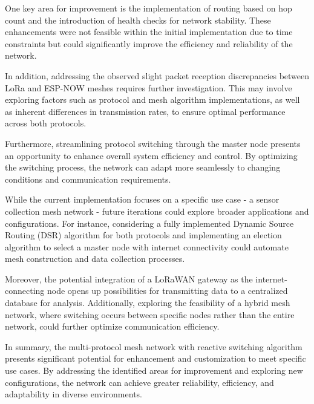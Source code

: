 One key area for improvement is the implementation of routing based on hop count and the introduction of health checks for network stability. These enhancements were not feasible within the initial implementation due to time constraints but could significantly improve the efficiency and reliability of the network.

In addition, addressing the observed slight packet reception discrepancies between LoRa and ESP-NOW meshes requires further investigation. This may involve exploring factors such as protocol and mesh algorithm implementations, as well as inherent differences in transmission rates, to ensure optimal performance across both protocols.

Furthermore, streamlining protocol switching through the master node presents an opportunity to enhance overall system efficiency and control. By optimizing the switching process, the network can adapt more seamlessly to changing conditions and communication requirements.

While the current implementation focuses on a specific use case - a sensor collection mesh network - future iterations could explore broader applications and configurations. For instance, considering a fully implemented Dynamic Source Routing (DSR) algorithm for both protocols and implementing an election algorithm to select a master node with internet connectivity could automate mesh construction and data collection processes.

Moreover, the potential integration of a LoRaWAN gateway as the internet-connecting node opens up possibilities for transmitting data to a centralized database for analysis. Additionally, exploring the feasibility of a hybrid mesh network, where switching occurs between specific nodes rather than the entire network, could further optimize communication efficiency.

In summary, the multi-protocol mesh network with reactive switching algorithm presents significant potential for enhancement and customization to meet specific use cases. By addressing the identified areas for improvement and exploring new configurations, the network can achieve greater reliability, efficiency, and adaptability in diverse environments.
